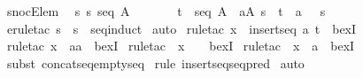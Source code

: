\begin{isabellebody}
\isanewline
\isanewline
{}\isamarkupfalse%
\ snocE{\isacharunderscore}lem{\isacharcolon}\ \isanewline
{\isachardoublequoteopen}{\isacharbang}{\isacharbang}\ s{\isachardot}\ s{\isacharcolon}\ seq\ A\ \ \isanewline
\ \ \ {\isacharequal}{\isacharequal}{\isachargreater}\ {\isacharparenleft}{\isacharquery}\ t\ {\isacharcolon}\ seq\ A{\isachardot}\ {\isacharquery}\ a{\isacharcolon}A{\isachardot}\ s\ {\isacharequal}\ t\ {\isacharpercent}{\isacharampersand}{\isacharcircum}\ {\isacharpercent}{\isacharless}a{\isacharpercent}{\isachargreater}\ {\isacharparenright}\ {\isacharbar}\ s\ {\isacharequal}\ {\isacharpercent}{\isacharless}{\isacharpercent}{\isachargreater}\ {\isachardoublequoteclose}\isanewline
%
\isadelimproof
%
\endisadelimproof
%
\isatagproof
{}\isamarkupfalse%
\ {\isacharparenleft}erule{\isacharunderscore}tac\ s\ {\isacharequal}\ {\isachardoublequoteopen}s{\isachardoublequoteclose}\ \ seq{\isacharunderscore}induct{\isacharparenright}\isanewline
{}\isamarkupfalse%
\ auto\isanewline
{}\isamarkupfalse%
\ {\isacharparenleft}rule{\isacharunderscore}tac\ x\ {\isacharequal}\ {\isachardoublequoteopen}insertseq\ a\ t{\isachardoublequoteclose}\ \ bexI{\isacharparenright}\isanewline
{}\isamarkupfalse%
\ {\isacharparenleft}rule{\isacharunderscore}tac\ x\ {\isacharequal}\ {\isachardoublequoteopen}aa{\isachardoublequoteclose}\ \ bexI{\isacharparenright}\isanewline
{}\isamarkupfalse%
\ {\isacharparenleft}rule{\isacharunderscore}tac\ {\isacharbrackleft}{}{\isacharbrackright}\ x\ {\isacharequal}\ {\isachardoublequoteopen}{\isacharpercent}{\isacharless}{\isacharpercent}{\isachargreater}{\isachardoublequoteclose}\ \ bexI{\isacharparenright}\isanewline
{}\isamarkupfalse%
\ {\isacharparenleft}rule{\isacharunderscore}tac\ {\isacharbrackleft}{}{\isacharbrackright}\ x\ {\isacharequal}\ {\isachardoublequoteopen}a{\isachardoublequoteclose}\ \ bexI{\isacharparenright}\isanewline
{}\isamarkupfalse%
\ {}\isanewline
{}\isamarkupfalse%
\ {\isacharparenleft}subst\ concatseq{\isacharunderscore}emptyseq{\isacharparenright}\isanewline
{}\isamarkupfalse%
\ {\isacharparenleft}rule\ insertseq{\isacharunderscore}seq{\isacharunderscore}pred{\isacharparenright}\isanewline
{}\isamarkupfalse%
\ auto\isanewline
{}\isamarkupfalse%
%
\endisatagproof
{\isafoldproof}%
%
\isadelimproof
\isanewline
%
\endisadelimproof

\end{isabellebody}
